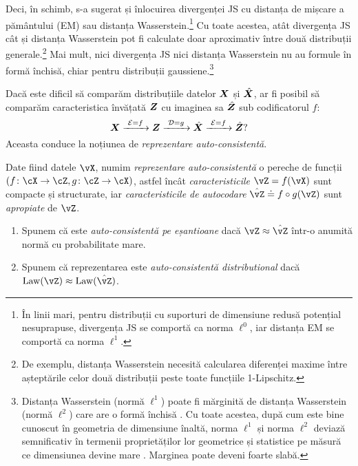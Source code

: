 \documentclass[../../book-main_ro.tex]{subfiles}
\begin{document}
Deci, în schimb, s-a sugerat și înlocuirea divergenței JS cu distanța de mișcare a pământului (EM) sau distanța Wasserstein.\footnote{În linii mari, pentru distribuții cu suporturi de dimensiune redusă potențial nesuprapuse, divergența JS se comportă ca norma $\ell^0$, iar distanța EM se comportă ca norma $\ell^1$.} Cu toate acestea, atât divergența JS cât și distanța Wasserstein pot fi calculate doar aproximativ între două distribuții generale.\footnote{De exemplu, distanța Wasserstein necesită calcularea diferenței maxime între așteptările celor două distribuții peste toate funcțiile 1-Lipschitz.} Mai mult, nici divergența JS nici distanța Wasserstein nu au formule în formă închisă, chiar pentru distribuții gaussiene.\footnote{Distanța Wasserstein (normă $\ell^1$) poate fi mărginită de distanța Wasserstein (normă $\ell^2$) care are o formă închisă \cite{salmona2021gromovwasserstein}. Cu toate acestea, după cum este bine cunoscut în geometria de dimensiune înaltă, norma $\ell^1$ și norma $\ell^2$ deviază semnificativ în termenii proprietăților lor geometrice și statistice pe măsură ce dimensiunea devine mare \cite{Wright-Ma-2021}. Marginea poate deveni foarte slabă.}

Dacă este dificil să comparăm distribuțiile datelor $\bm{X}$ și $\hat {\bm{X}}$, ar fi posibil să comparăm caracteristica învățată $\bm{Z}$ cu imaginea sa $\hat {\bm{Z}}$ sub codificatorul $f$:
\begin{equation}
 \bm{X}
\xrightarrow{\hspace{1mm} \mathcal{E} = f \hspace{1mm}} \bm{Z}  \xrightarrow{\hspace{1mm} \mathcal{D} = g \hspace{1mm}} \hat{\bm{X}} \xrightarrow{\hspace{1mm} \mathcal{E} = f \hspace{1mm}} \hat {\bm{Z}}?
\label{eqn:closed-autoencoding}
\end{equation}
Aceasta conduce la noțiunea de {\em reprezentare auto-consistentă}.
\begin{definition}\label{def:closed_loop}
    Date fiind datele \(\vX\), numim \textit{reprezentare auto-consistentă} o pereche de funcții \((f \colon \cX \to \cZ, g \colon \cZ \to \cX)\), astfel încât \textit{caracteristicile} \(\vZ = f(\vX)\) sunt compacte și structurate, iar \textit{caracteristicile de autocodare} \(\hat{\vZ} \doteq f \circ g(\vZ)\) sunt \textit{apropiate} de \(\vZ\).
    \begin{enumerate}
        \item Spunem că este \textit{auto-consistentă pe eșantioane} dacă \(\vZ \approx \hat{\vZ}\) într-o anumită normă cu probabilitate mare.
        \item Spunem că reprezentarea este \textit{auto-consistentă distributional} dacă \(\Law(\vZ) \approx \Law(\hat{\vZ})\).
    \end{enumerate}
\end{definition}
\end{document}
